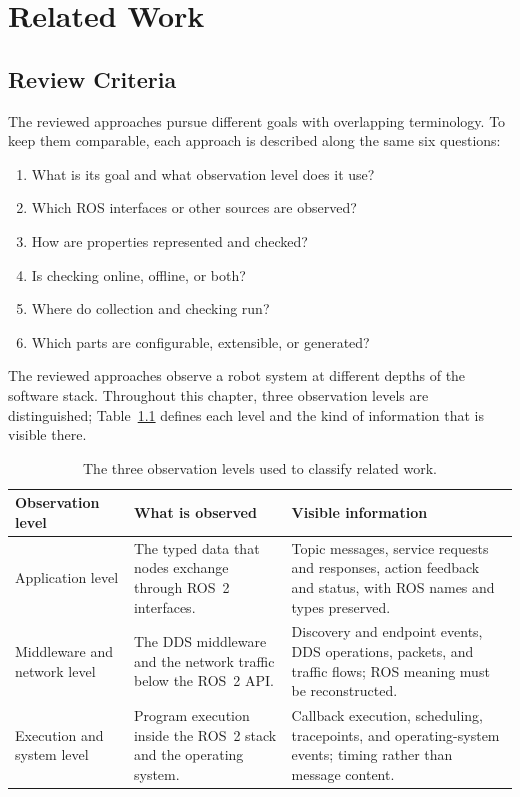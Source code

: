 \chapter{Related Work}\label{chapter:related_work}

\section{Review Criteria}

The reviewed approaches pursue different goals with overlapping terminology.
To keep them comparable, each approach is described along the same six
questions:

\begin{enumerate}
  \item What is its goal and what observation level does it use?
  \item Which ROS interfaces or other sources are observed?
  \item How are properties represented and checked?
  \item Is checking online, offline, or both?
  \item Where do collection and checking run?
  \item Which parts are configurable, extensible, or generated?
\end{enumerate}

The reviewed approaches observe a robot system at different depths of the
software stack. Throughout this chapter, three observation levels are
distinguished; Table~\ref{tab:observation-levels} defines each level and the
kind of information that is visible there.

\begin{table}[htbp]
\centering
\caption{The three observation levels used to classify related work.}
\label{tab:observation-levels}
\begin{tabular}{
  >{\raggedright\arraybackslash}p{}
  >{\raggedright\arraybackslash}p{}
  >{\raggedright\arraybackslash}p{}}
\toprule
\textbf{Observation level} & \textbf{What is observed} &
\textbf{Visible information}\\
\midrule
Application level & The typed data that nodes exchange through ROS~2
interfaces. & Topic messages, service requests and responses, action feedback
and status, with ROS names and types preserved.\\
\addlinespace
Middleware and network level & The DDS middleware and the network traffic
below the ROS~2 API. & Discovery and endpoint events, DDS operations, packets,
and traffic flows; ROS meaning must be reconstructed.\\
\addlinespace
Execution and system level & Program execution inside the ROS~2 stack and the
operating system. & Callback execution, scheduling, tracepoints, and
operating-system events; timing rather than message content.\\
\bottomrule
\end{tabular}
\end{table}


